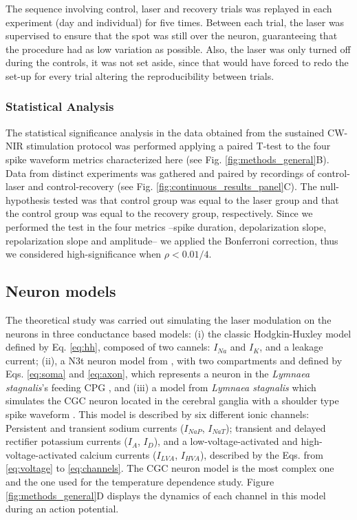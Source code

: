 The sequence involving control, laser and recovery trials was replayed in each experiment (day and individual) for five times. Between each trial, the laser was supervised to ensure that the spot was still over the neuron, guaranteeing that the procedure had as low variation as possible. Also, the laser was only turned off during the controls, it was not set aside, since that would have forced to redo the set-up for every trial altering the reproducibility between trials. 

\subsubsection{Statistical Analysis}
\label{sect:statistical_analysis}
The statistical significance analysis in the data obtained from the sustained CW-NIR stimulation protocol was performed applying a paired T-test to the four spike waveform metrics characterized here (see Fig. \ref{fig:methods_general}B). Data from distinct experiments was gathered and paired by recordings of control-laser and control-recovery (see Fig. \ref{fig:continuous_results_panel}C). The null-hypothesis tested was that control group was equal to the laser group and that the control group was equal to the recovery group, respectively. Since we performed the test in the four metrics --spike duration, depolarization slope, repolarization slope and amplitude-- we applied the Bonferroni correction, thus we considered high-significance when $\rho < 0.01/4$.


\subsection{Neuron models}
\label{sec:model equations}
The theoretical study was carried out simulating the laser modulation on the neurons in three conductance based models: (i) the classic Hodgkin-Huxley model \cite{Hodgkin1952} defined by Eq. \ref{eq:hh}, composed of two cannels: $I_{Na}$ and $I_K$, and a leakage current; (ii), a N3t neuron model from \cite{Vavoulis2007}, with two compartments and defined by Eqs. \ref{eq:soma} and \ref{eq:axon}, which represents a neuron in the \textit{Lymnaea stagnalis}'s feeding CPG \cite{garrido-pena_characterization_2021}, and (iii) a model from \textit{Lymnaea stagnalis} which simulates the CGC neuron located in the cerebral ganglia with a shoulder type spike waveform \cite{Vavoulis2010}. This model is described by six different ionic channels: Persistent and transient sodium currents ($I_{NaP}$, $I_{NaT}$); transient and delayed rectifier potassium currents ($I_A$, $I_D$), and a low-voltage-activated and high-voltage-activated calcium currents ($I_{LVA}$, $I_{HVA}$), described by the Eqs. from \ref{eq:voltage} to \ref{eq:channels}. The CGC neuron model is the most complex one and the one used for the temperature dependence study.  Figure \ref{fig:methods_general}D displays the dynamics of each channel in this model during an action potential.


